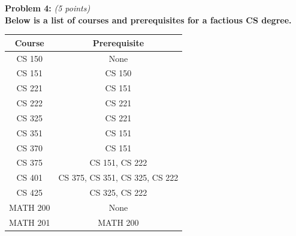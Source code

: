 \documentclass{article}
\begin{document}
\noindent \textbf{Problem 4:} \textit{(5 points)} \\

\noindent \textbf{Below is a list of courses and prerequisites for a factious CS degree.}
\\[.25cm]

\begin{center}
 \begin{tabular}{||c | c||} 
 \hline
\textbf{Course} & \textbf{Prerequisite} \\ 
 \hline\hline
 CS 150 & None  \\ 
 \hline
 CS 151 & CS 150  \\ 
 \hline
  CS 221 & CS 151  \\ 
 \hline
  CS 222 & CS 221  \\ 
 \hline
  CS 325 & CS 221  \\ 
 \hline
  CS 351 & CS 151 \\ 
 \hline
  CS 370 & CS 151  \\ 
 \hline
  CS 375 & CS 151, CS 222  \\ 
 \hline
  CS 401 & CS 375, CS 351, CS 325, CS 222 \\ 
 \hline
  CS 425 & CS 325, CS 222 \\ 
 \hline
    MATH 200 & None  \\ 
 \hline
   MATH 201 & MATH 200  \\ 
 \hline
\end{tabular}
\end{center}
\end{document}
